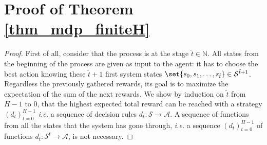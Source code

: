 






\section{Proof of Theorem \ref{thm_mdp_finiteH}}
\begin{proof}
First of all, consider that the process is at the stage $\tilde{t} \in \mathbb{N}$.
All states from the beginning of the process are given as input to the agent:
it has to choose the best action knowing these $\tilde{t}+1$ first system states 
$\set{ s_0, s_1, \ldots, s_{\tilde{t}} } \in \mathcal{S}^{\tilde{t}+1}$.
Regardless the previously gathered rewards, 
its goal is to maximize the expectation of the sum of the next rewards. 
We show by induction on $\tilde{t}$ from $H-1$ to $0$,
that the highest expected total reward can be reached with a strategy $(d_t)_{t=0}^{H-1}$
\textit{i.e.} a sequence of decision rules $d_t: \mathcal{S} \rightarrow \mathcal{A}$.
A sequence of functions from all the states that the system has gone through,
\textit{i.e.} a sequence $(d_t)_{t=0}^{H-1}$ of functions $d_t: \mathcal{S}^t \rightarrow \mathcal{A}$, 
is not necessary.


\end{proof}
